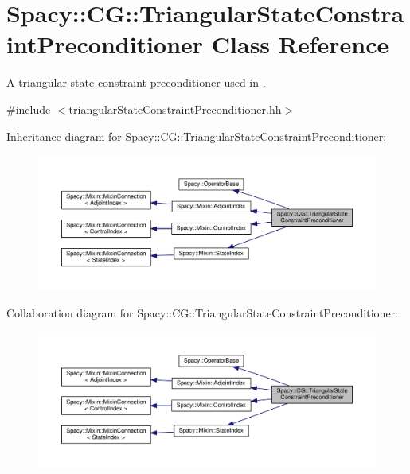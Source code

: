 \hypertarget{classSpacy_1_1CG_1_1TriangularStateConstraintPreconditioner}{}\section{Spacy\+:\+:C\+G\+:\+:Triangular\+State\+Constraint\+Preconditioner Class Reference}
\label{classSpacy_1_1CG_1_1TriangularStateConstraintPreconditioner}


A triangular state constraint preconditioner used in \cite{Lubkoll2015a}.  




{\ttfamily \#include $<$triangular\+State\+Constraint\+Preconditioner.\+hh$>$}



Inheritance diagram for Spacy\+:\+:C\+G\+:\+:Triangular\+State\+Constraint\+Preconditioner\+:\nopagebreak
\begin{figure}[H]
\begin{center}
\leavevmode
\includegraphics[width=350pt]{classSpacy_1_1CG_1_1TriangularStateConstraintPreconditioner__inherit__graph}
\end{center}
\end{figure}


Collaboration diagram for Spacy\+:\+:C\+G\+:\+:Triangular\+State\+Constraint\+Preconditioner\+:\nopagebreak
\begin{figure}[H]
\begin{center}
\leavevmode
\includegraphics[width=350pt]{classSpacy_1_1CG_1_1TriangularStateConstraintPreconditioner__coll__graph}
\end{center}
\end{figure}
